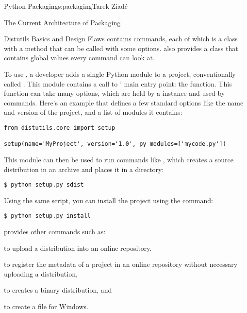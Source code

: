 \begin{aosachapter}{Python Packaging}{s:packaging}{Tarek Ziad\'{e}}
\begin{aosasect1}{The Current Architecture of Packaging}
\begin{aosasect2}{Distutils Basics and Design Flaws}
 contains commands, each of which is a class with a
 method that can be called with some options.  
also provides a  class that contains global values
every command can look at.

To use , a developer adds a single Python module to a
project, conventionally called . This module contains a
call to ' main entry point: the  function.  This
function can take many options, which are held by a
 instance and used by commands.  Here's an example
that defines a few standard options like the name and version of the
project, and a list of modules it contains:

\pagebreak

\begin{verbatim}
from distutils.core import setup

setup(name='MyProject', version='1.0', py_modules=['mycode.py'])
\end{verbatim}

\noindent This module can then be used to run  commands like
, which creates a source distribution in an archive and
places it in a  directory:

\begin{verbatim}
$ python setup.py sdist
\end{verbatim}

\noindent Using the same script, you can install the project using the
 command:

\begin{verbatim}
$ python setup.py install
\end{verbatim}

 provides other commands such as:

\begin{aosaitemize}

  \item {} to upload a distribution into an online repository.

  \item {} to register the metadata of a project in an online
  repository without necessary uploading a distribution,

  \item {} to creates a binary distribution, and

  \item {} to create a  file for Windows.


\end{aosaitemize}
\end{aosasect2}
\end{aosasect1}
\end{aosachapter}
